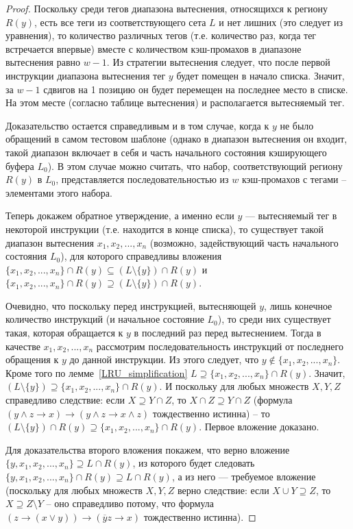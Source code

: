 \begin{proof}
  Поскольку среди тегов диапазона вытеснения, относящихся к региону $R(y)$,
  есть все теги из соответствующего сета $L$ и
  нет лишних (это следует из уравнения), то количество различных
  тегов (т.е. количество раз, когда тег встречается впервые) вместе с
  количеством кэш-промахов в диапазоне вытеснения равно $w{-}1$. Из
  стратегии вытеснения следует, что после первой инструкции
  диапазона вытеснения тег $y$ будет помещен в начало списка.
  Значит, за $w{-}1$ сдвигов на 1 позицию он будет перемещен на
  последнее место в списке. На этом месте (согласно таблице вытеснения)
  и располагается вытесняемый тег.

  Доказательство остается справедливым и в том случае, когда к $y$
  не было обращений в самом тестовом шаблоне (однако в диапазон
  вытеснения он входит, такой диапазон включает в себя и часть
  начального состояния кэширующего буфера $L_0$). В этом случае
  можно считать, что набор, соответствующий региону $R(y)$ в $L_0$,
  представляется последовательностью из $w$ кэш-промахов с тегами --
  элементами этого набора.

  Теперь докажем обратное утверждение, а именно если $y$ --- вытесняемый
  тег в некоторой инструкции (т.е. находится в конце списка), то
  существует такой диапазон вытеснения $x_1, x_2, ..., x_n$
  (возможно, задействующий часть начального состояния $L_0$), для
  которого справедливы вложения $\{x_1, x_2, ..., x_n\} \cap R(y) \subseteq (L\setminus\{y\}) \cap R(y)$ и $\{x_1, x_2, ..., x_n\} \cap R(y) \supseteq(L\setminus\{y\}) \cap R(y)$.

  Очевидно, что поскольку перед инструкцией, вытесняющей $y$, лишь
  конечное количество инструкций (и начальное состояние $L_0$), то
  среди них существует такая, которая обращается к $y$ в последний
  раз перед вытеснением. Тогда в качестве $x_1, x_2, ..., x_n$
  рассмотрим последовательность инструкций от последнего обращения к
  $y$ до данной инструкции. Из этого следует, что $y \notin \{x_1,
  x_2, ..., x_n\}$. Кроме того по лемме~\ref{LRU_simplification} $L
  \supseteq \{x_1, x_2, ..., x_n\} \cap R(y)$. Значит,
  $(L\setminus\{y\}) \supseteq \{x_1, x_2, ..., x_n\} \cap R(y)$. И
  поскольку для любых множеств $X, Y, Z$ справедливо следствие: если
  $X \supseteq Y \cap Z$, то $X\cap Z \supseteq Y \cap Z$ (формула
  $(y \wedge z \rightarrow x) \rightarrow (y \wedge z \rightarrow x
  \wedge z)$ тождественно истинна) -- то $(L\setminus\{y\}) \cap
  R(y) \supseteq \{x_1, x_2, ..., x_n\} \cap R(y)$. Первое вложение
  доказано.

  Для доказательства второго вложения покажем, что верно вложение\\
  $\{y, x_1, x_2, ..., x_n\} \supseteq L \cap R(y)$, из
  которого будет следовать\\ $\{y, x_1, x_2, ..., x_n\} \cap R(y) \supseteq L \cap R(y)$, а из него --- требуемое вложение (поскольку для любых
  множеств $X, Y, Z$ верно следствие: если $X \cup Y\supseteq Z$,
  то $X \supseteq Z \setminus Y$ -- оно справедливо потому, что
  формула $(z \rightarrow (x \vee y))\rightarrow(\overline{y}z\rightarrow x)$
  тождественно истинна).


\end{proof}
